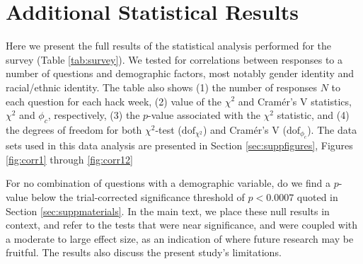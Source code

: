 \documentclass{aastex62}
\begin{document}
\clearpage

\section{Additional Statistical Results}

Here we present the full results of the statistical analysis performed for the survey (Table \ref{tab:survey}). We tested for correlations between responses to a number of questions and demographic factors, most notably gender identity and racial/ethnic identity. The table also shows (1) the number of responses $N$ to each question for each hack week, (2) value of the $\chi^2$ and Cram\'{e}r's V statistics, $\chi^2$ and $\phi_c$, respectively, (3) the $p$-value associated with the $\chi^2$ statistic, and (4) the degrees of freedom for both $\chi^2$-test ($\mathrm{dof}_{\chi^2}$) and Cram\'{e}r's V ($\mathrm{dof}_{\phi_c}$). The data sets used in this data analysis are presented in Section \ref{sec:suppfigures}, Figures \ref{fig:corr1} through \ref{fig:corr12}


For no combination of questions with a demographic variable, do we ﬁnd a $p$-value below the trial-corrected signiﬁcance threshold of $p < 0.0007$ quoted in Section \ref{sec:suppmaterials}. In the main text, we place these null results in context, and refer to the tests that were near significance, and were coupled with a moderate to large effect size, as an indication of where future research may be fruitful. The results also discuss the present study's limitations.
\end{document}
